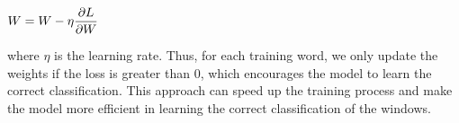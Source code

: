 \documentclass[12pt]{article}
\begin{document}
\begin{description}
  \begin{center}
    $\displaystyle{W = W - \eta \pdv{L}{W}}$
  \end{center}

  where $\eta$ is the learning rate. Thus, for each training word, we only update the weights if the loss is greater than 0, which encourages the model to learn the correct 
  classification. This approach can speed up the training process and make the model more efficient in learning the correct classification of the windows. 

  \pagebreak
  
\end{description}
\end{document}
